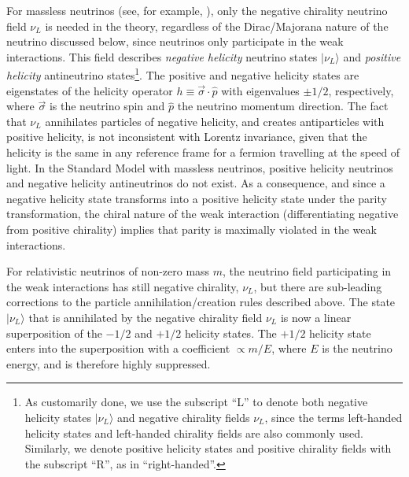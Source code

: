 For massless neutrinos (see, for example, \cite{Hernandez:2010mi}), only the negative chirality neutrino field $\nu_L$ is needed in the theory, regardless of the Dirac/Majorana nature of the neutrino discussed below, since neutrinos only participate in the weak interactions. This field describes \emph{negative helicity} neutrino states $\lvert\nu_L\rangle$ and \emph{positive helicity} antineutrino states\footnote{As customarily done, we use the subscript ``L'' to denote both negative helicity states $\lvert\nu_L\rangle$ and negative chirality fields $\nu_L$, since the terms left-handed helicity states and left-handed chirality fields are also commonly used. Similarly, we denote positive helicity states and positive chirality fields with the subscript ``R'', as in ``right-handed''.}. The positive and negative helicity states are eigenstates of the helicity operator $h\equiv \vec{\sigma}\cdot\hat{p}$ with eigenvalues $\pm 1/2$, respectively, where $\vec{\sigma}$ is the neutrino spin and $\hat{p}$ the neutrino momentum direction. The fact that $\nu_L$ annihilates particles of negative helicity, and creates antiparticles with positive helicity, is not inconsistent with Lorentz invariance, given that the helicity is the same in any reference frame for a fermion travelling at the speed of light. In the Standard Model with massless neutrinos, positive helicity neutrinos and negative helicity antineutrinos do not exist. As a consequence, and since a negative helicity state transforms into a positive helicity state under the parity transformation, the chiral nature of the weak interaction (differentiating negative from positive chirality) implies that parity is maximally violated in the weak interactions.

For relativistic neutrinos of non-zero mass $m$, the neutrino field participating in the weak interactions has still negative chirality, $\nu_L$, but there are sub-leading corrections to the particle annihilation/creation rules described above. The state $\lvert\nu_L\rangle$ that is annihilated by the negative chirality field $\nu_{L}$ is now a linear superposition of the $-1/2$ and $+1/2$ helicity states. The $+1/2$ helicity state enters into the superposition with a coefficient $\propto m/E$, where $E$ is the neutrino energy, and is therefore highly suppressed. 

